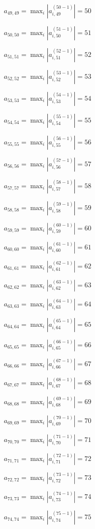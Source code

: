 \documentclass[a4paper,12pt]{article}
\begin{document}
$a _{ 49, 49 } =  \max _i |a _{ i, 49 } ^{ (50 - 1) } | = 50$

$a _{ 50, 50 } =  \max _i |a _{ i, 50 } ^{ (51 - 1) } | = 51$

$a _{ 51, 51 } =  \max _i |a _{ i, 51 } ^{ (52 - 1) } | = 52$

$a _{ 52, 52 } =  \max _i |a _{ i, 52 } ^{ (53 - 1) } | = 53$

$a _{ 53, 53 } =  \max _i |a _{ i, 53 } ^{ (54 - 1) } | = 54$

$a _{ 54, 54 } =  \max _i |a _{ i, 54 } ^{ (55 - 1) } | = 55$

$a _{ 55, 55 } =  \max _i |a _{ i, 55 } ^{ (56 - 1) } | = 56$

$a _{ 56, 56 } =  \max _i |a _{ i, 56 } ^{ (57 - 1) } | = 57$

$a _{ 57, 57 } =  \max _i |a _{ i, 57 } ^{ (58 - 1) } | = 58$

$a _{ 58, 58 } =  \max _i |a _{ i, 58 } ^{ (59 - 1) } | = 59$

$a _{ 59, 59 } =  \max _i |a _{ i, 59 } ^{ (60 - 1) } | = 60$

$a _{ 60, 60 } =  \max _i |a _{ i, 60 } ^{ (61 - 1) } | = 61$

$a _{ 61, 61 } =  \max _i |a _{ i, 61 } ^{ (62 - 1) } | = 62$

$a _{ 62, 62 } =  \max _i |a _{ i, 62 } ^{ (63 - 1) } | = 63$

$a _{ 63, 63 } =  \max _i |a _{ i, 63 } ^{ (64 - 1) } | = 64$

$a _{ 64, 64 } =  \max _i |a _{ i, 64 } ^{ (65 - 1) } | = 65$

$a _{ 65, 65 } =  \max _i |a _{ i, 65 } ^{ (66 - 1) } | = 66$

$a _{ 66, 66 } =  \max _i |a _{ i, 66 } ^{ (67 - 1) } | = 67$

$a _{ 67, 67 } =  \max _i |a _{ i, 67 } ^{ (68 - 1) } | = 68$

$a _{ 68, 68 } =  \max _i |a _{ i, 68 } ^{ (69 - 1) } | = 69$

$a _{ 69, 69 } =  \max _i |a _{ i, 69 } ^{ (70 - 1) } | = 70$

$a _{ 70, 70 } =  \max _i |a _{ i, 70 } ^{ (71 - 1) } | = 71$

$a _{ 71, 71 } =  \max _i |a _{ i, 71 } ^{ (72 - 1) } | = 72$

$a _{ 72, 72 } =  \max _i |a _{ i, 72 } ^{ (73 - 1) } | = 73$

$a _{ 73, 73 } =  \max _i |a _{ i, 73 } ^{ (74 - 1) } | = 74$

$a _{ 74, 74 } =  \max _i |a _{ i, 74 } ^{ (75 - 1) } | = 75$
\end{document}
